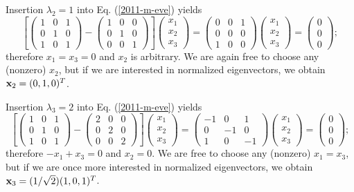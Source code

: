 {Insertion  $\lambda_2=1$ into Eq. (\ref{2011-m-eve}) yields
\begin{equation}
\left[
\begin{pmatrix}
1&0&1\\
0&1&0\\
1&0&1
\end{pmatrix}  -
\begin{pmatrix}
1&0&0\\
0&1&0\\
0&0&1
\end{pmatrix}
\right]
\begin{pmatrix}
x_1\\
x_2\\
x_3
\end{pmatrix}
=
\begin{pmatrix}
0&0&1\\
0&0&0\\
1&0&0
\end{pmatrix}
\begin{pmatrix}
x_1\\
x_2\\
x_3
\end{pmatrix}
=
\begin{pmatrix}
0\\
0\\
0
\end{pmatrix}
;
\end{equation}
therefore $x_1=x_3=0$ and $x_2$ is arbitrary.
We are again free to choose any (nonzero) $x_2$,
but if we are interested in normalized eigenvectors, we obtain
${\bf x}_2 = (0,1,0)^T$.


Insertion  $\lambda_3=2$ into Eq. (\ref{2011-m-eve}) yields
\begin{equation}
\left[
\begin{pmatrix}
1&0&1\\
0&1&0\\
1&0&1
\end{pmatrix}  -
\begin{pmatrix}
2&0&0\\
0&2&0\\
0&0&2
\end{pmatrix}
\right]
\begin{pmatrix}
x_1\\
x_2\\
x_3
\end{pmatrix}
=
\begin{pmatrix}
-1&0&1\\
0&-1&0\\
1&0&-1
\end{pmatrix}
\begin{pmatrix}
x_1\\
x_2\\
x_3
\end{pmatrix}
=
\begin{pmatrix}
0\\
0\\
0
\end{pmatrix}
;
\end{equation}
therefore $-x_1+x_3=0$ and $x_2=0$.
We are free to choose any (nonzero) $x_1=x_3$,
but if we are once more interested in normalized eigenvectors, we obtain
${\bf x}_3 =(1/\sqrt{2})(1,0,1)^T$.

}
